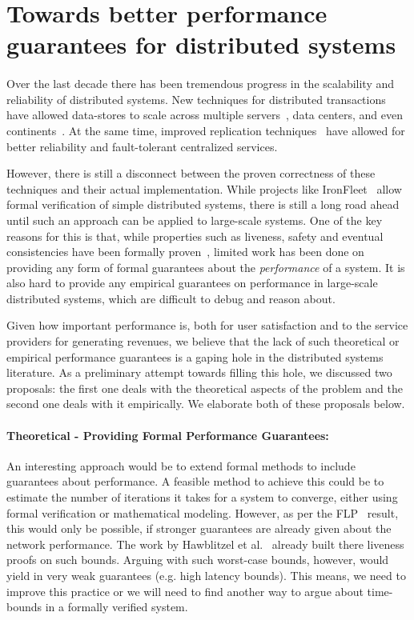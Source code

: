 \section{Towards better performance guarantees for distributed systems}

\paragraph{}
Over the last decade there has been tremendous progress in the scalability and reliability of distributed systems.
New techniques for distributed transactions have allowed data-stores to scale across multiple servers~\cite{aguilera2007sinfonia}, data centers, and even continents~\cite{Lloyd:2011:DSE:2043556.2043593}.  At the same time, improved replication techniques~\cite{van2004chain} have allowed for better reliability and fault-tolerant centralized services.

However, there is still a disconnect between the proven correctness of these techniques and their actual implementation. While projects like IronFleet~\cite{hawblitzel2015ironfleet} allow formal verification of simple distributed systems, there is still a long road ahead until such an approach can be applied to large-scale systems.
One of the key reasons for this is that, while properties such as liveness, safety and eventual consistencies have been formally proven~\cite{floyd1967assigning}, limited work has been done on providing any form of formal guarantees about the \emph{performance} of a system. It is also hard to provide any empirical guarantees on performance in large-scale distributed systems, which are difficult to debug and reason about.

Given how important performance is,  both for user satisfaction and to the service providers for generating revenues, we believe that the lack of such theoretical or empirical performance guarantees is a gaping hole in the distributed systems literature. As a preliminary attempt towards filling this hole, we discussed two proposals: the first one deals with the theoretical aspects of the problem and the second one deals with it empirically. We elaborate both of these proposals below.

\paragraph{Theoretical - Providing Formal Performance Guarantees:} An interesting approach would be to extend formal methods to include guarantees about performance. A feasible method to achieve this could be to estimate the number of iterations it takes for a system to converge, either using formal verification or mathematical modeling. However, as per the FLP~\cite{fischer1985impossibility} result, this would only be possible, if stronger guarantees are already given about the network performance. The work by Hawblitzel et al.~\cite{hawblitzel2015ironfleet} already built there liveness proofs on such bounds. Arguing with such worst-case bounds, however, would yield in very weak guarantees (e.g. high latency bounds). This means, we need to improve this practice or we will need to find another way to argue about time-bounds in a formally verified system.

